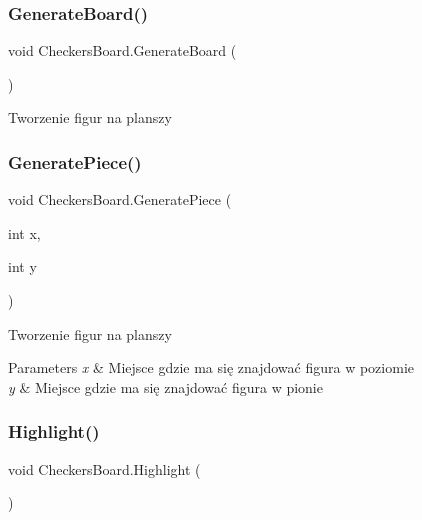 \mbox{\label{class_checkers_board_acc289a7520fabb912525ef2a417a6e14}} 
\subsubsection{\texorpdfstring{GenerateBoard()}{GenerateBoard()}}
{\footnotesize\ttfamily void Checkers\+Board.\+Generate\+Board (\begin{DoxyParamCaption}{ }\end{DoxyParamCaption})\hspace{0.3cm}{\ttfamily [private]}}



Tworzenie figur na planszy 

\mbox{\label{class_checkers_board_aea3617cd6463f7b4d01ab8688ecec3ad}} 
\subsubsection{\texorpdfstring{GeneratePiece()}{GeneratePiece()}}
{\footnotesize\ttfamily void Checkers\+Board.\+Generate\+Piece (\begin{DoxyParamCaption}\item[{int}]{x,  }\item[{int}]{y }\end{DoxyParamCaption})\hspace{0.3cm}{\ttfamily [private]}}



Tworzenie figur na planszy 


\begin{DoxyParams}{Parameters}
{\em x} & Miejsce gdzie ma się znajdować figura w poziomie \\
\hline
{\em y} & Miejsce gdzie ma się znajdować figura w pionie \\
\hline
\end{DoxyParams}
\mbox{\label{class_checkers_board_a7b684b257525287c52741b1e6d2ae30a}} 
\subsubsection{\texorpdfstring{Highlight()}{Highlight()}}
{\footnotesize\ttfamily void Checkers\+Board.\+Highlight (\begin{DoxyParamCaption}{ }\end{DoxyParamCaption})\hspace{0.3cm}{\ttfamily [private]}}



